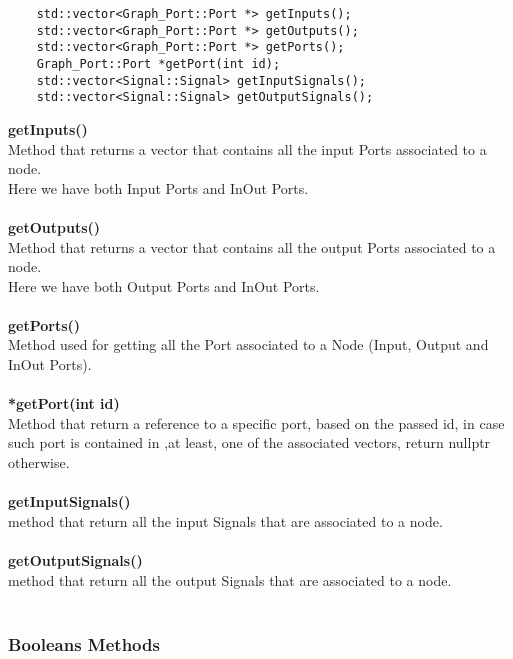 \documentclass{article}
\begin{document}
\begin{mdframed}[hidealllines=true, backgroundcolor=magenta!10]
	\begin{lstlisting}
	std::vector<Graph_Port::Port *> getInputs();
	std::vector<Graph_Port::Port *> getOutputs();
	std::vector<Graph_Port::Port *> getPorts();
	Graph_Port::Port *getPort(int id);
	std::vector<Signal::Signal> getInputSignals();
	std::vector<Signal::Signal> getOutputSignals();
	\end{lstlisting}
\end{mdframed}

\textbf{getInputs()}\\
Method that returns a vector that contains all the input Ports associated to a node.\\
Here we have both Input Ports and InOut Ports.\\\\

\textbf{getOutputs()}\\
Method that returns a vector that contains all the output Ports associated to a node.\\
Here we have both Output Ports and InOut Ports.\\\\

\textbf{getPorts()}\\
Method used for getting all the Port associated to a Node (Input, Output and InOut Ports).\\\\

\textbf{ *getPort(int id)}\\
Method that return a reference to a specific port, based on the passed id, in case such port is contained in ,at least, one of the associated vectors, return nullptr otherwise.\\\\

\textbf{getInputSignals()}\\
method that return all the input Signals that are associated to a node.\\\\

\textbf{getOutputSignals()}\\
method that return all the output Signals that are associated to a node.\\\\

\subsubsection{Booleans Methods}
\end{document}
